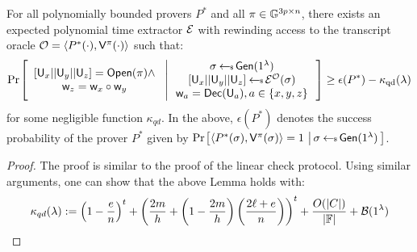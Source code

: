 \begin{lemma}[Soundness]\label{lem:quadcheck_sound}
For all polynomially bounded provers $P^\ast$ and all $\pi\in \mathbb{G}^{3p\times n}$,
there exists an expected polynomial time extractor $\mathcal{E}$ with rewinding access
to the transcript oracle $\mathcal{O}=\langle P^\ast(\cdot),\mathsf{V}^{\pi}(\cdot)\rangle$
such that:
{\small
\begin{align*}
\condprob{
\begin{array}{c}
{[}\ewit_x||\ewit_y||\ewit_z{]}=\open(\pi)\wedge \\
\wit_z=\wit_x\circ\wit_y
\end{array}
}{
\begin{array}{c}
\sigma\sample \gen(\secparam) \\
{[}\ewit_x||\ewit_y||\ewit_z{]}\sample \extr^{\mc{O}}(\sigma)\\
\wit_a=\dec(\ewit_a), a\in \{x,y,z\}
\end{array}
}\geq \epsilon(P^\ast) - \kappa_{\rm qd}(\secpar)
\end{align*}
}
for some negligible function $\kappa_{qd}$. In the above, $\epsilon(P^\ast)$
denotes the success probability of the prover $P^\ast$ given by
$\condprob{\innp{P^\ast(\sigma)}{\verifier^\pi(\sigma)}=1}{\sigma\sample
\gen(\secparam)}$.
\end{lemma}
\begin{proof}
The proof is similar to the proof of the linear check protocol. Using similar
arguments, one can show that the above Lemma holds with:
{\small
\begin{equation*}
\kappa_{qd}(\lambda) := \left(1-\frac{e}{n}\right)^t +
\left(\frac{2m}{h}+\left(1-\frac{2m}{h}\right)\left(\frac{2\ell+e}{n}\right)\right)^t
+ \frac{O(|C|)}{|\mathbb{F}|} + \mathcal{B}(1^{\lambda})
\end{equation*}
}
\end{proof}

